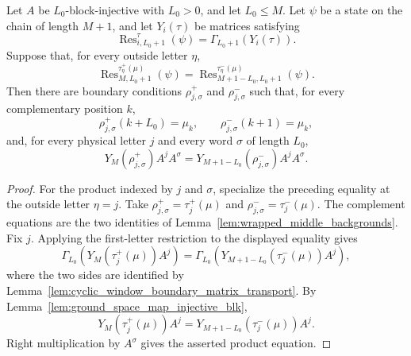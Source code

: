 \begin{lemma}
    \label{lem:closure_property_auxiliary_product_from_closing_restrictions}
    \leanok
    Let $A$ be $L_0$-block-injective with $L_0>0$, and let $L_0\le M$.
    Let $\psi$ be a state on the chain of length $M+1$, and let
    $Y_i(\tau)$ be matrices satisfying
    \[
        \operatorname{Res}^{\tau}_{i,L_0+1}(\psi)
        =
        \Gamma_{L_0+1}(Y_i(\tau)).
    \]
    Suppose that, for every outside letter $\eta$,
    \[
        \operatorname{Res}^{\tau^+_\eta(\mu)}_{M,L_0+1}(\psi)
        =
        \operatorname{Res}^{\tau^-_\eta(\mu)}_{M+1-L_0,L_0+1}(\psi).
    \]
    Then there are boundary conditions $\rho^+_{j,\sigma}$ and
    $\rho^-_{j,\sigma}$ such that, for every complementary position $k$,
    \[
        \rho^+_{j,\sigma}(k+L_0)=\mu_k,
        \qquad
        \rho^-_{j,\sigma}(k+1)=\mu_k,
    \]
    and, for every physical letter $j$ and every word $\sigma$ of length
    $L_0$,
    \[
        Y_M(\rho^+_{j,\sigma})A^jA^\sigma
        =
        Y_{M+1-L_0}(\rho^-_{j,\sigma})A^jA^\sigma.
    \]
\end{lemma}

\begin{proof}
    \leanok
    For the product indexed by $j$ and $\sigma$, specialize the preceding
    equality at the outside letter $\eta=j$. Take
    $\rho^+_{j,\sigma}=\tau^+_j(\mu)$ and
    $\rho^-_{j,\sigma}=\tau^-_j(\mu)$.  The complement equations are the two
    identities of Lemma~\ref{lem:wrapped_middle_backgrounds}.  Fix $j$.  Applying
    the first-letter restriction to the displayed equality gives
    \[
        \Gamma_{L_0}\!\left(Y_M(\tau^+_j(\mu))A^j\right)
        =
        \Gamma_{L_0}\!\left(Y_{M+1-L_0}(\tau^-_j(\mu))A^j\right),
    \]
    where the two sides are identified by
    Lemma~\ref{lem:cyclic_window_boundary_matrix_transport}.  By
    Lemma~\ref{lem:ground_space_map_injective_blk},
    \[
        Y_M(\tau^+_j(\mu))A^j
        =
        Y_{M+1-L_0}(\tau^-_j(\mu))A^j.
    \]
    Right multiplication by $A^\sigma$ gives the asserted product equation.
\end{proof}

